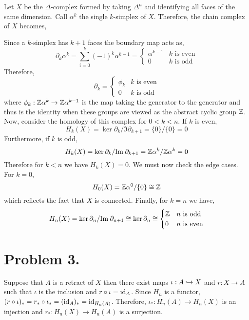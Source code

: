 \documentclass[12pt]{extarticle}
\begin{document}
Let $X$ be the $\Delta$-complex formed by taking $\Delta^n$ and identifying all faces of the same dimension. Call $\alpha^k$ the single $k$-simplex of $X$. Therefore, the chain complex of $X$ becomes,

\begin{center}
\end{center}
Since a $k$-simplex has $k + 1$ faces the boundary map acts as,
\[ \partial_k \alpha^k = \sum_{i = 0}^k (-1)^k \alpha^{k-1} = 
\begin{cases}
\alpha^{k-1} & k \text{ is even} \\
0 & k \text{ is odd}
\end{cases}\]
Therefore, 
\[ \partial_k = 
\begin{cases}
\phi_k & k \text{ is even} \\
0 & k \text{ is odd}
\end{cases}\]
where $\phi_k : \mathbb{Z}\alpha^k \to \mathbb{Z} \alpha^{k-1}$ is the map taking the generator to the generator and thus is the identity when these groups are viewed as the abstract cyclic group $\mathbb{Z}$. Now, consider the homology of this complex for $0 < k < n$. If $k$ is even,
\[ H_k(X) = \ker{\partial_k} / \Im{\partial_{k+1}} = \{0\}/\{0\} = 0 \]
Furthermore, if $k$ is odd,
\[ H_k(X) = \ker{\partial_k} / \mathrm{Im} \: \partial_{k + 1} = \mathbb{Z} \alpha^{k} / \mathbb{Z} \alpha^{k} = 0 \]
Therefore for $k < n$ we have $H_k(X) = 0$. We must now check the edge cases. For $k = 0$,
\[
H_0(X) = \mathbb{Z} \alpha^0 / \{0\} \cong \mathbb{Z} 
\]
which reflects the fact that $X$ is connected.
Finally, for $k = n$ we have,
\[ H_n(X) = \ker{\partial_n} / \mathrm{Im} \: \partial_{n+1} \cong \ker{\partial_n} \cong
\begin{cases}
\mathbb{Z} & n \text{ is odd} \\
0 & n \text{ is even}
\end{cases}\]
 

\section*{Problem 3.}

Suppose that $A$ is a retract of $X$ then there exist maps $\iota : A \hookrightarrow X$ and $r : X \to A$ such that $\iota$ is the inclusion and $r \circ \iota = \mathrm{id}_{A}$. Since $H_n$ is a functor, $(r \circ \iota)_* = r_* \circ \iota_* = (\mathrm{id}_{A})_* = \mathrm{id}_{H_n(A)}$. Therefore, $\iota_* : H_n(A) \to H_n(X)$ is an injection and $r_* : H_n(X) \to H_n(A)$ is a surjection.  
\end{document}
